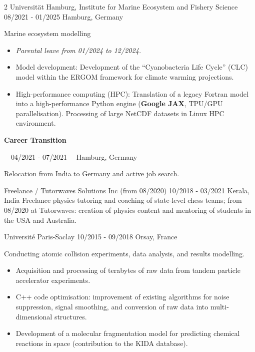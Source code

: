 \documentclass{thejus_cv}
\begin{document}
\begin{paracol}{2}
             {Universit\"at Hamburg, Institute for Marine Ecosystem and Fishery Science}
             {08/2021 - 01/2025}
             {Hamburg, Germany}
             {Marine ecosystem modelling
             \begin{itemize}\setlength{\itemsep}{0.05em}
                 \item \textit{Parental leave from 01/2024 to 12/2024.}
                 \item Model development: Development of the ``Cyanobacteria Life Cycle'' (CLC) model within the ERGOM framework for climate warming projections.
                 \item High-performance computing (HPC): Translation of a legacy Fortran model into a high-performance Python engine (\textbf{Google JAX}, TPU/GPU parallelisation). Processing of large NetCDF datasets in Linux HPC environment.
             \end{itemize}}

{\large\textbf{Career Transition}}\par
{\small\color{cvgray}\faCalendar\ \ 04/2021 - 07/2021 \hspace{0.5cm} \faMapMarker\ \ Hamburg, Germany}\par
\vspace{0.2em}
{\color{cvlightgray}\hdashrule{\linewidth}{0.5pt}{1mm}}\par
\vspace{0.2em}
Relocation from India to Germany and active job search.
\vspace{0.3em}

             {Freelance / Tutorwaves Solutions Inc (from 08/2020)}
             {10/2018 - 03/2021}
             {Kerala, India}
             {Freelance physics tutoring and coaching of state-level chess teams; from 08/2020 at Tutorwaves: creation of physics content and mentoring of students in the USA and Australia.}

             {Universit\'e Paris-Saclay}
             {10/2015 - 09/2018}
             {Orsay, France}
             {Conducting atomic collision experiments, data analysis, and results modelling.
             \begin{itemize}
                 \item Acquisition and processing of terabytes of raw data from tandem particle accelerator experiments.
                 \item C++ code optimisation: improvement of existing algorithms for noise suppression, signal smoothing, and conversion of raw data into multi-dimensional structures.
                 \item Development of a molecular fragmentation model for predicting chemical reactions in space (contribution to the KIDA database).
             \end{itemize}}



\end{paracol}
\end{document}
